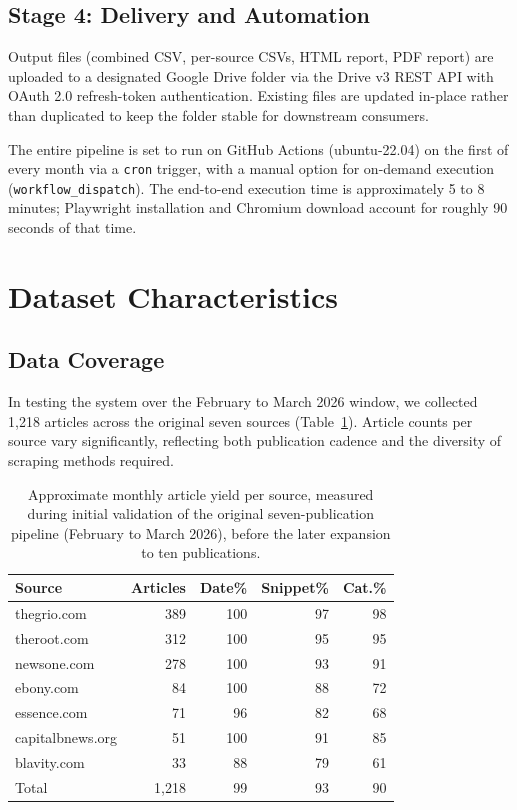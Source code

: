 \documentclass[letterpaper]{article}
\begin{document}
\subsection{Stage 4: Delivery and Automation}

Output files (combined CSV, per-source CSVs, HTML report, PDF report)
are uploaded to a designated Google Drive folder via the Drive v3 REST
API with OAuth 2.0 refresh-token authentication. Existing files are
updated in-place rather than duplicated to keep the folder stable for
downstream consumers.

The entire pipeline is set to run on GitHub Actions (ubuntu-22.04) on
the first of every month via a \texttt{cron} trigger, with a manual
option for on-demand execution (\texttt{workflow\_dispatch}). The
end-to-end execution time is approximately 5 to 8 minutes; Playwright
installation and Chromium download account for roughly 90 seconds of
that time.

\section{Dataset Characteristics}
\label{sec:dataset}

\subsection{Data Coverage}

In testing the system over the February to March 2026 window, we
collected 1,218 articles across the original seven sources
(Table~\ref{tab:coverage}). Article counts per source vary
significantly, reflecting both publication cadence and the diversity of
scraping methods required.

\begin{table}[t]
\centering
\small
\begin{tabular}{lrrrr}
\toprule
Source & Articles & Date\% & Snippet\% & Cat.\% \\
\midrule
thegrio.com      & 389 & 100 & 97 & 98 \\
theroot.com      & 312 & 100 & 95 & 95 \\
newsone.com      & 278 & 100 & 93 & 91 \\
ebony.com        &  84 & 100 & 88 & 72 \\
essence.com      &  71 &  96 & 82 & 68 \\
capitalbnews.org &  51 & 100 & 91 & 85 \\
blavity.com      &  33 &  88 & 79 & 61 \\
\midrule
Total            & 1{,}218 & 99 & 93 & 90 \\
\bottomrule
\end{tabular}
\caption{Approximate monthly article yield per source, measured during
initial validation of the original seven-publication pipeline (February
to March 2026), before the later expansion to ten publications.}
\label{tab:coverage}
\end{table}
\end{document}
